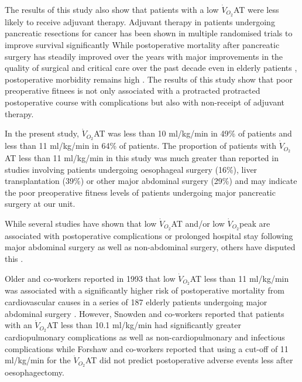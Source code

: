 The results of this study also show that patients with a low $\dot{V}_{O_2}$AT were less likely to receive adjuvant therapy. 
Adjuvant therapy in patients undergoing pancreatic resections for cancer has been shown in multiple randomised trials to improve survival significantly \parencite{neoptolemos_randomized_2004, neoptolemos_adjuvant_2009}
While postoperative mortality after pancreatic surgery has steadily improved over the years with major improvements in the quality of surgical and critical care over the past decade \parencite{winter_1423_2006} even in elderly patients \parencite{makary_pancreaticoduodenectomy_2006}, postoperative morbidity remains high \parencite{mann_review_2010}. 
The results of this study show that poor preoperative fitnees is not only associated with a protracted protracted postoperative course with complications but also with non-receipt of adjuvant therapy.

In the present study, $\dot{V}_{O_2}$AT was less than 10 ml/kg/min in 49\% of patients and less than 11 ml/kg/min in 64\% of patients. 
The proportion of patients with $\dot{V}_{O_2}$AT less than 11 ml/kg/min in this study was much greater than reported in studies involving patients undergoing oesophageal surgery (16\%),\parencite{forshaw_is_2008} liver transplantation (39\%)\parencite{epstein_aerobic_2004} or other major abdominal surgery (29\%)\parencite{older_preoperative_1993} and may indicate the poor preoperative fitness levels of patients undergoing major pancreatic surgery at our unit. 

While several studies have shown that low $\dot{V}_{O_2}$AT and/or low $\dot{V}_{O_2}$peak are associated with postoperative complications or prolonged hospital stay following major abdominal surgery as well as non-abdominal surgery,\parencite{older_preoperative_1993, epstein_aerobic_2004, mccullough_cardiorespiratory_2006, nagamatsu_preoperative_2001, older_cardiopulmonary_1999, older_clinical_2004} others have disputed this \parencite{forshaw_is_2008, clayton_cardiopulmonary_2011, hightower_pilot_2010}. 

Older and co-workers reported in 1993 that low $\dot{V}_{O_2}$AT less than 11 ml/kg/min was associated with a significantly higher risk of postoperative mortality from cardiovascular causes in a series of 187 elderly patients undergoing major abdominal surgery \parencite{older_preoperative_1993}.
However, Snowden and co-workers \parencite{snowden_submaximal_2010} reported that patients with an $\dot{V}_{O_2}$AT less than 10.1 ml/kg/min had significantly greater cardiopulmonary complications as well as non-cardiopulmonary and infectious complications while Forshaw and co-workers \parencite{forshaw_is_2008} reported that using a cut-off of 11 ml/kg/min for the $\dot{V}_{O_2}$AT did not predict postoperative adverse events less after oesophagectomy. 

